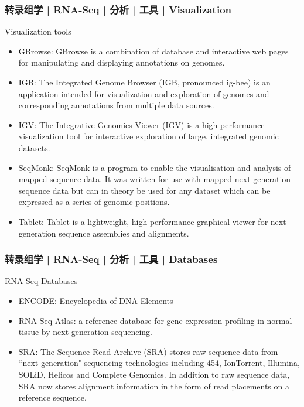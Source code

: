 \begin{frame}
  \frametitle{转录组学 | RNA-Seq | 分析 | 工具 | Visualization}
  {\footnotesize
  \begin{block}{Visualization tools}
    \begin{itemize}
      \item GBrowse: GBrowse is a combination of database and interactive web pages for manipulating and displaying annotations on genomes.
      \item IGB: The Integrated Genome Browser (IGB, pronounced ig-bee) is an application intended for visualization and exploration of genomes and corresponding annotations from multiple data sources. 
      \item IGV: The Integrative Genomics Viewer (IGV) is a high-performance visualization tool for interactive exploration of large, integrated genomic datasets.
      \item SeqMonk: SeqMonk is a program to enable the visualisation and analysis of mapped sequence data. It was written for use with mapped next generation sequence data but can in theory be used for any dataset which can be expressed as a series of genomic positions.
      \item Tablet: Tablet is a lightweight, high-performance graphical viewer for next generation sequence assemblies and alignments.
    \end{itemize}
  \end{block}
  }
\end{frame}

\begin{frame}
  \frametitle{转录组学 | RNA-Seq | 分析 | 工具 | Databases}
  \begin{block}{RNA-Seq Databases}
    \begin{itemize}
      \item ENCODE: Encyclopedia of DNA Elements
      \item RNA-Seq Atlas: a reference database for gene expression profiling in normal tissue by next-generation sequencing.
      \item SRA: The Sequence Read Archive (SRA) stores raw sequence data from ``next-generation" sequencing technologies including 454, IonTorrent, Illumina, SOLiD, Helicos and Complete Genomics. In addition to raw sequence data, SRA now stores alignment information in the form of read placements on a reference sequence.
    \end{itemize}
  \end{block}
\end{frame}

